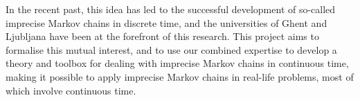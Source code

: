 \documentclass[11pt,dvipsnames,usenames,a4paper]{article}
\begin{document}
In the recent past, this idea has led to the successful development of so-called imprecise Markov chains in discrete time, and the universities of Ghent and Ljubljana have been at the forefront of this research. 
This project aims to formalise this mutual interest, and to use our combined expertise to develop a theory and toolbox for dealing with imprecise Markov chains in continuous time, making it possible to apply imprecise Markov chains in real-life problems, most of which involve continuous time.






\end{document}

